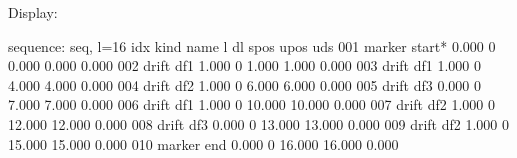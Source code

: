 \documentclass[letterpaper,10pt,english]{sphinxmanual}
\begin{document}
\begin{sphinxVerbatim}[commandchars=\\\{\}]
     
     
                     
 
   
 
   
 
\end{sphinxVerbatim}

\sphinxAtStartPar
Display:

\begin{sphinxVerbatim}[commandchars=\\\{\}]
sequence: seq, l=16
idx  kind          name       l          dl       spos       upos    uds
001  marker        \PYGZdl{}start*    0.000       0       0.000      0.000   0.000
002  drift         df1        1.000       0       1.000      1.000   0.000
003  drift         df1\PYGZsq{}       1.000       0       4.000      4.000   0.000
004  drift         df2\PYGZsq{}       1.000       0       6.000      6.000   0.000
005  drift         df3\PYGZsq{}       0.000       0       7.000      7.000   0.000
006  drift         df1\PYGZsq{}\PYGZsq{}      1.000       0      10.000     10.000   0.000
007  drift         df2\PYGZsq{}\PYGZsq{}      1.000       0      12.000     12.000   0.000
008  drift         df3\PYGZsq{}\PYGZsq{}      0.000       0      13.000     13.000   0.000
009  drift         df2        1.000       0      15.000     15.000   0.000
010  marker        \PYGZdl{}end       0.000       0      16.000     16.000   0.000
\end{sphinxVerbatim}
\end{document}
